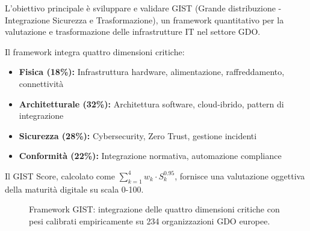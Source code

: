 L'obiettivo principale è sviluppare e validare GIST (Grande distribuzione - Integrazione Sicurezza e Trasformazione), un framework quantitativo per la valutazione e trasformazione delle infrastrutture IT nel settore GDO.

Il framework integra quattro dimensioni critiche:
\begin{itemize}
\item \textbf{Fisica (18\%):} Infrastruttura hardware, alimentazione, raffreddamento, connettività
\item \textbf{Architetturale (32\%):} Architettura software, cloud-ibrido, pattern di integrazione
\item \textbf{Sicurezza (28\%):} Cybersecurity, Zero Trust, gestione incidenti
\item \textbf{Conformità (22\%):} Integrazione normativa, automazione compliance
\end{itemize}

Il GIST Score, calcolato come $\sum_{k=1}^{4} w_k \cdot S_k^{0.95}$, fornisce una valutazione oggettiva della maturità digitale su scala 0-100.

\begin{figure}[htbp]
\centering
{}
\caption{Framework GIST: integrazione delle quattro dimensioni critiche con pesi calibrati empiricamente su 234 organizzazioni GDO europee.}
\label{fig:gist_framework_simple}
\end{figure}

